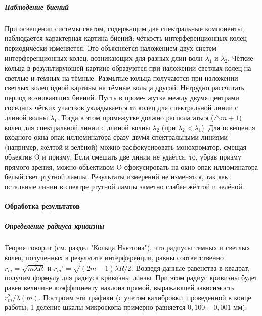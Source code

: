 \documentclass[12pt]{article}
\begin{document}
		\subparagraph{Наблюдение биений}
		При освещении системы светом, содержащим две спектральные компоненты, наблюдается характерная картина
		биений: чёткость интерференционных колец периодически изменяется.
		Это объясняется наложением двух систем интерференционных колец,
		возникающих для разных длин волн $\lambda_1$ и $\lambda_2$. Чёткие кольца в результирующей картине образуются при наложении светлых колец на светлые и тёмных на тёмные. Размытые кольца получаются при наложении
		светлых колец одной картины на тёмные кольца другой.
		Нетрудно рассчитать период возникающих биений. Пусть в проме-
		жутке между двумя центрами соседних чётких участков укладывается
		m колец для спектральной линии с длиной волны $\lambda_1$. Тогда в этом
		промежутке должно располагаться ($\triangle m + 1$) колец для спектральной
		линии с длиной волны $\lambda_2$ (при $\lambda_2 < \lambda_1$).
		Для освещения входного окна опак-иллюминатора сразу двумя спектральными линиями (например, жёлтой и зелёной) можно
		расфокусировать монохроматор, смещая объектив O и призму.
		Если смешать две линии не удаётся, то, убрав призму прямого зрения, можно объективом O сфокусировать на окно опак-иллюминатора
		белый свет ртутной лампы. Результаты измерений не изменятся, так
		как остальные линии в спектре ртутной лампы заметно слабее жёлтой
		и зелёной.
		
		\paragraph{Обработка результатов}
		
		\subparagraph{Определение радиуса кривизны}
		
		
		Теория говорит (см. раздел "Кольца Ньютона"), что радиусы темных и светлых колец, полученных в результате интерференции, равны соответственно $r_m = \sqrt{m\lambda R}$
		 и $r_m' = \sqrt{(2m-1)\lambda R/2}$. Возведя данные равенства в квадрат, получим формулу для радиуса кривизны линзы. При этом радиус кривизны будет равен величине коэффициенту наклона прямой, выражающей зависимость $r_m^2/\lambda (m)$. Построим эти графики (с учетом калибровки, проведенной в конце работы, 1 деление шкалы микроскопа примерно равняется $0,100\pm 0,001$ мм).
		
\end{document}
